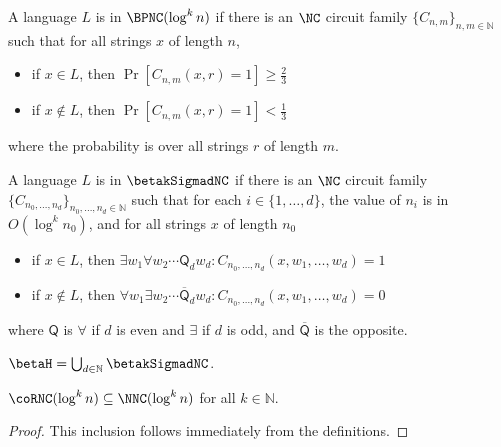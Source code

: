 \documentclass{article}
\newcommand{\quant}{\mathsf{Q}}
\newcommand{\notquant}{\overline{\mathsf{Q}}}
\begin{document}
\begin{definition}
  A language $L$ is in $\BPNC(\log^k n)$ if there is an $\NC$ circuit family $\{C_{n, m}\}_{n, m \in \mathbb{N}}$ such that for all strings $x$ of length $n$,
  \begin{itemize}
  \item if $x \in L$, then $\Pr[C_{n, m}(x, r) = 1] \geq \frac{2}{3}$
  \item if $x \notin L$, then $\Pr[C_{n, m}(x, r) = 1] < \frac{1}{3}$
  \end{itemize}
  where the probability is over all strings $r$ of length $m$.
\end{definition}

\begin{definition}
  A language $L$ is in $\betakSigmadNC$ if there is an $\NC$ circuit family $\{C_{n_0, \dotsc, n_d}\}_{n_0, \dotsc, n_d \in \mathbb{N}}$ such that for each $i \in \{1, \dotsc, d\}$, the value of $n_i$ is in $O(\log^k n_0)$, and for all strings $x$ of length $n_0$
  \begin{itemize}
  \item if $x \in L$, then $\exists w_1 \forall w_2 \dotsb \quant_d w_d \colon C_{n_0, \dotsc, n_d}(x, w_1, \dotsc, w_d) = 1$
  \item if $x \notin L$, then $\forall w_1 \exists w_2 \dotsb \notquant_d w_d \colon C_{n_0, \dotsc, n_d}(x, w_1, \dotsc, w_d) = 0$
  \end{itemize}
  where $\quant$ is $\forall$ if $d$ is even and $\exists$ if $d$ is odd, and $\notquant$ is the opposite.
\end{definition}

\begin{definition}
  $\betaH = \bigcup_{d \in \mathbb{N}} \betakSigmadNC$.
\end{definition}

\begin{theorem}
  $\coRNC(\log^k n) \subseteq \NNC(\log^k n)$ for all $k \in \mathbb{N}$.
\end{theorem}
\begin{proof}
  This inclusion follows immediately from the definitions.
\end{proof}
\end{document}
